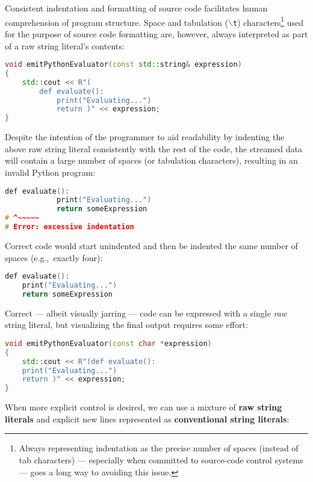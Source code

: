 Consistent indentation and formatting of source code facilitates human
comprehension of program structure. Space and tabulation
(\texttt{$\backslash$t}) characters{\cprotect\footnote{Always
representing indentation as the precise number of spaces (instead of
tab characters) --- especially when committed to source-code control
  systems --- goes a long way to avoiding this issue.}} used for the
purpose of source code formatting are, however, always interpreted as
part of a raw string literal's contents:

\begin{lstlisting}[language=C++]
void emitPythonEvaluator(const std::string& expression)
{
    std::cout << R"(
        def evaluate():
            print("Evaluating...")
            return )" << expression;
}
\end{lstlisting}
    
\noindent Despite the intention of the programmer to aid readability by indenting
the above raw string literal consistently with the rest of the code, the
streamed data will contain a large number of spaces (or tabulation
characters), resulting in an invalid Python program:

\begin{lstlisting}[language=C++]
        def evaluate():
            print("Evaluating...")
            return someExpression
# ^~~~~~
# Error: excessive indentation
\end{lstlisting}
    
\noindent Correct code would start unindented and then be indented the same number
of spaces (e.g.,~exactly four):

\begin{lstlisting}[language=C++]
def evaluate():
    print("Evaluating...")
    return someExpression
\end{lstlisting}
    
\noindent Correct --- albeit visually jarring --- code can be expressed with a
single \emph{raw} string literal, but visualizing the final output requires some effort:

\begin{lstlisting}[language=C++]
void emitPythonEvaluator(const char *expression)
{
    std::cout << R"(def evaluate():
    print("Evaluating...")
    return )" << expression;
}
\end{lstlisting}
    
\noindent When more explicit control is desired, we can use a mixture of
\textbf{raw string literals} and explicit new lines represented as
\textbf{conventional string literals}:

